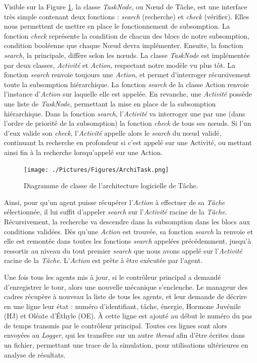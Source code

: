 			Visible sur la Figure \ref{ArchiTask}, la classe \textit{TaskNode}, ou Nœud de Tâche, est une interface très simple contenant deux fonctions : \textit{search} (recherche) et \textit{check} (vérifier). Elles nous permettent de mettre en place le fonctionnement de subsomption. La fonction \textit{check} représente la condition de chacun des blocs de notre subsomption, condition booléenne que chaque Nœud devra implémenter. Ensuite, la fonction \textit{search}, la principale, diffère selon les nœuds. La classe \textit{TaskNode} est implémentée par deux classes, \textit{Activité} et \textit{Action}, respectant notre modèle vu plus tôt. La fonction \textit{search} renvoie toujours une \textit{Action}, et permet d'interroger récursivement toute la subsomption hiérarchique. La fonction \textit{search} de la classe Action renvoie l'instance d'\textit{Action} sur laquelle elle est appelée. En revanche, une \textit{Activité} possède une liste de \textit{TaskNode}, permettant la mise en place de la subsomption hiérarchique. Dans la fonction \textit{search}, l'\textit{Activité} va interroger une par une (dans l'ordre de priorité de la subsomption) la fonction \textit{check} de tous ses nœuds. Si l'un d'eux valide son \textit{check}, l'\textit{Activité} appelle alors le \textit{search} du nœud validé, continuant la recherche en profondeur si c'est appelé sur une Activité, ou mettant ainsi fin à la recherche lorsqu'appelé sur une Action.
			
			\begin{figure}
			\centering
			\texttt{[image: ./Pictures/Figures/ArchiTask.png]}
			\caption{Diagramme de classe de l'architecture logicielle de Tâche.}
			\label{ArchiTask}
			\end{figure}
			
			Ainsi, pour qu'un agent puisse récupérer l'\textit{Action} à effectuer de sa \textit{Tâche} sélectionnée, il lui suffit d'appeler \textit{search} sur l'\textit{Activité} racine de la \textit{Tâche}. Récursivement, la recherche va descendre dans la subsomption dans les blocs aux conditions validées. Dès qu'une \textit{Action} est trouvée, sa fonction \textit{search} la renvoie et elle est remontée dans toutes les fonctions \textit{search} appelées précédemment, jusqu'à ressortir au niveau du tout premier \textit{search} que nous avons appelé sur l'\textit{Activité} racine de la \textit{Tâche}. L'\textit{Action} est prête à être exécutée par l'agent.
			
			
			Une fois tous les agents mis à jour, si le contrôleur principal a demandé d'enregistrer le tour, alors une nouvelle mécanique s'enclenche. Le manageur des cadres récupère à nouveau la liste de tous les agents, et leur demande de décrire en une ligne leur état : numéro d'identifiant, tâche, énergie, Hormone Juvénile (HJ) et Oléate d'Éthyle (OE). À cette ligne est ajouté au début le numéro du pas de temps transmis par le contrôleur principal. Toutes ces lignes sont alors envoyées au \textit{Logger}, qui les transfère sur un autre \textit{thread} afin d'être écrites dans un fichier, permettant une trace de la simulation, pour utilisations ultérieures en analyse de résultats.
			
